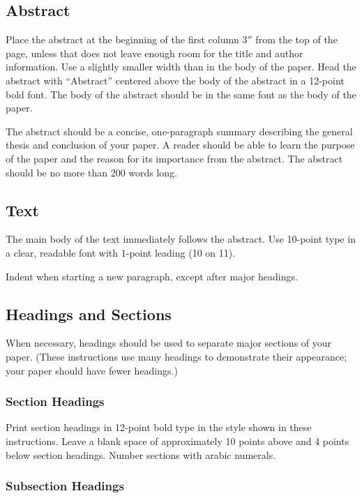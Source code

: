 \documentclass{article}
\begin{document}
\subsection{Abstract}

Place the abstract at the beginning of the first column 3$''$ from the
top of the page, unless that does not leave enough room for the title
and author information. Use a slightly smaller width than in the body
of the paper. Head the abstract with ``Abstract'' centered above the
body of the abstract in a 12-point bold font. The body of the abstract
should be in the same font as the body of the paper.

The abstract should be a concise, one-paragraph summary describing the
general thesis and conclusion of your paper. A reader should be able
to learn the purpose of the paper and the reason for its importance
from the abstract. The abstract should be no more than 200 words long.

\subsection{Text}

The main body of the text immediately follows the abstract. Use
10-point type in a clear, readable font with 1-point leading (10 on
11).

Indent when starting a new paragraph, except after major headings.

\subsection{Headings and Sections}

When necessary, headings should be used to separate major sections of
your paper. (These instructions use many headings to demonstrate their
appearance; your paper should have fewer headings.)

\subsubsection{Section Headings}

Print section headings in 12-point bold type in the style shown in
these instructions. Leave a blank space of approximately 10 points
above and 4 points below section headings.  Number sections with
arabic numerals.

\subsubsection{Subsection Headings}
\end{document}
